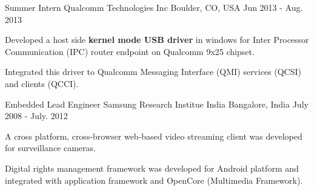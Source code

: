 \begin{cventries}
  \cventry
    {Summer Intern} %
    {Qualcomm Technologies Inc} %
    {Boulder, CO, USA} %
    {Jun 2013 - Aug. 2013} %
    {
      \begin{cvitems} %
	\item {Developed a host side \textbf{kernel mode USB driver} in windows for Inter Processor Communication (IPC) router
endpoint on Qualcomm 9x25 chipset.} %
       \item {Integrated this driver to Qualcomm Messaging Interface (QMI) services (QCSI) and clients (QCCI).}
      \end{cvitems}
    }

  \cventry
    {Embedded Lead Engineer} %
    {Samsung Research Institue India} %
    {Bangalore, India} %
    {July 2008 - July. 2012} %
    {
	\begin{cvitems} %
	\item {A cross platform, cross-browser web-based video streaming client was developed for surveillance cameras.}
	\item {Digital rights management framework was developed for Android platform and integrated with application framework and OpenCore (Multimedia Framework).}
	\end{cvitems}
    }
\end{cventries}
